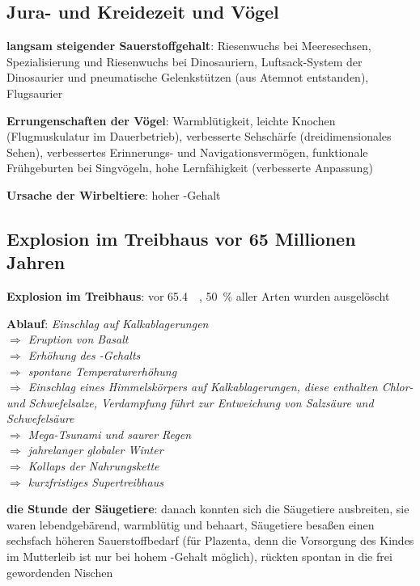 \subsection{%
    Jura- und Kreidezeit und Vögel%
}

\textbf{langsam steigender Sauerstoffgehalt}:
Riesenwuchs bei Meeresechsen,
Spezialisierung und Riesenwuchs bei Dinosauriern,
Luftsack-System der Dinosaurier und pneumatische Gelenkstützen (aus Atemnot entstanden),
Flugsaurier

\textbf{Errungenschaften der Vögel}:
Warmblütigkeit,
leichte Knochen (Flugmuskulatur im Dauerbetrieb),
verbesserte Sehschärfe (dreidimensionales Sehen),
verbessertes Erinnerungs- und Navigationsvermögen,
funktionale Frühgeburten bei Singvögeln,
hohe Lernfähigkeit (verbesserte Anpassung)

\textbf{Ursache der Wirbeltiere}:
hoher -Gehalt

\subsection{%
    Explosion im Treibhaus vor 65 Millionen Jahren%
}

\textbf{Explosion im Treibhaus}:
vor \SI{65.4}{\mega\year},
\SI{50}{\percent} aller Arten wurden ausgelöscht

\begin{wichtig}
    \item
    \textbf{Ablauf}:
    \emph{Einschlag auf Kalkablagerungen\\
    $\Rightarrow$ Eruption von Basalt\\
    $\Rightarrow$ Erhöhung des -Gehalts\\
    $\Rightarrow$ spontane Temperaturerhöhung\\
    $\Rightarrow$ Einschlag eines Himmelskörpers auf Kalkablagerungen,
    diese enthalten Chlor- und Schwefelsalze,
    Verdampfung führt zur Entweichung von Salzsäure und Schwefelsäure\\
    $\Rightarrow$ Mega-Tsunami und saurer Regen\\
    $\Rightarrow$ jahrelanger globaler Winter\\
    $\Rightarrow$ Kollaps der Nahrungskette\\
    $\Rightarrow$ kurzfristiges Supertreibhaus}
\end{wichtig}

\textbf{die Stunde der Säugetiere}:
danach konnten sich die Säugetiere ausbreiten,
sie waren lebendgebärend, warmblütig und behaart,
Säugetiere besaßen einen sechsfach höheren Sauerstoffbedarf
(für Plazenta, denn die Vorsorgung des Kindes im Mutterleib
ist nur bei hohem -Gehalt möglich),
rückten spontan in die frei gewordenden Nischen

